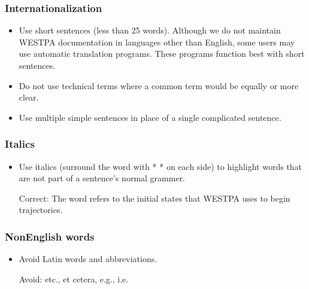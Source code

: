 \documentclass[letterpaper,10pt,english]{sphinxmanual}
\begin{document}
\subsubsection{Internationalization}
\label{\detokenize{development/style_guide:internationalization}}\begin{itemize}
\item {} 
Use short sentences (less than 25 words). Although we do not maintain
WESTPA documentation in languages other than English, some users may use
automatic translation programs. These programs function best with short
sentences.

\item {} 
Do not use technical terms where a common term would be equally or more
clear.

\item {} 
Use multiple simple sentences in place of a single complicated sentence.

\end{itemize}


\subsubsection{Italics}
\label{\detokenize{development/style_guide:italics}}\begin{itemize}
\item {} 
Use italics (surround the word with * * on each side) to highlight words
that are not part of a sentence’s normal grammer.

Correct: The word  refers to the initial states that WESTPA uses to
begin trajectories.

\end{itemize}


\subsubsection{Non\sphinxhyphen{}English words}
\label{\detokenize{development/style_guide:non-english-words}}\begin{itemize}
\item {} 
Avoid Latin words and abbreviations.

Avoid: etc., et cetera, e.g., i.e.

\end{itemize}
\end{document}
